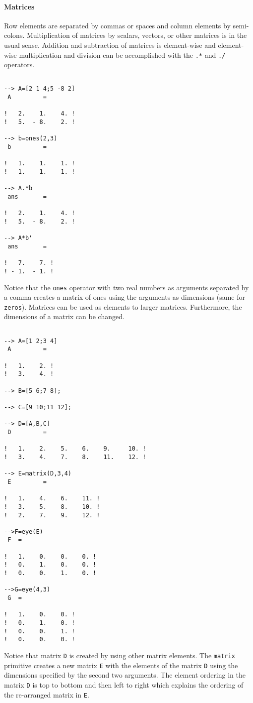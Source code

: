 \paragraph{Matrices}\label{Matrices}
Row elements are separated by commas or spaces
 and column elements by semi-colons.  Multiplication
of matrices by scalars, vectors, or other matrices is in the usual
sense.  Addition and
subtraction of matrices is element-wise and element-wise
multiplication and division can be accomplished with the {\tt .*}
and {\tt ./} operators.
\begin{verbatim}
 
--> A=[2 1 4;5 -8 2]
 A         =
 
!   2.    1.    4. !
!   5.  - 8.    2. !
 
--> b=ones(2,3)
 b         =
 
!   1.    1.    1. !
!   1.    1.    1. !
 
--> A.*b
 ans       =
 
!   2.    1.    4. !
!   5.  - 8.    2. !
 
--> A*b'
 ans       =
 
!   7.    7. !
! - 1.  - 1. !
\end{verbatim}
Notice that the {\tt ones}
operator with two real numbers as arguments separated
by a comma creates a matrix of ones using the arguments as
dimensions (same for {\tt zeros}).
Matrices can be used as elements to larger 
matrices.  Furthermore,
the dimensions of a matrix can be changed.
\begin{verbatim}
 
--> A=[1 2;3 4]
 A         =
 
!   1.    2. !
!   3.    4. !
 
--> B=[5 6;7 8];
 
--> C=[9 10;11 12];
 
--> D=[A,B,C]
 D         =
 
!   1.    2.    5.    6.    9.     10. !
!   3.    4.    7.    8.    11.    12. !
 
--> E=matrix(D,3,4)
 E         =
 
!   1.    4.    6.    11. !
!   3.    5.    8.    10. !
!   2.    7.    9.    12. !

-->F=eye(E)
 F  =
 
!   1.    0.    0.    0. !
!   0.    1.    0.    0. !
!   0.    0.    1.    0. !
 
-->G=eye(4,3)
 G  =
 
!   1.    0.    0. !
!   0.    1.    0. !
!   0.    0.    1. !
!   0.    0.    0. !

\end{verbatim}
Notice that matrix {\tt D} is created by using other matrix
elements.  The {\tt matrix} 
primitive creates a new matrix {\tt E} with the elements of the
matrix {\tt D} using
the dimensions specified by the second two arguments.  The element
ordering in the matrix {\tt D} is top to bottom and then left to right
which explains the ordering of the re-arranged matrix in {\tt E}.

